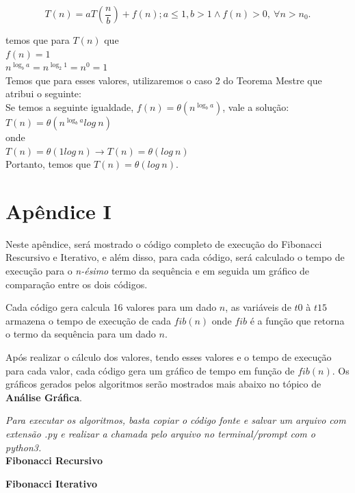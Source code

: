 \documentclass[a4paper, 12pt]{article}
\begin{document}
\begin{equation}
T(n)= aT(\frac{n}{b})+f(n); a\leq1, b>1 \wedge f(n) > 0, \ \forall n>n_0.
\end{equation}

temos que para $T(n)$ que\\

$f(n)=1$\\
$n^{\log_b a} = n^{\log_2 1} = n^0 = 1$\\

Temos que para esses valores, utilizaremos o caso 2 do Teorema Mestre que atribui o seguinte:\\

Se temos a seguinte igualdade, $f(n) = \theta(n^{\log_b a})$, vale a solução:\\

$T(n) = \theta(n^{\log_b a}log \ n)$ \\

onde \\

$T(n) = \theta(1log \ n) \rightarrow T(n) = \theta(log \ n)$ \\

Portanto, temos que $T(n) = \theta(log \ n)$.

\newpage
\section{Apêndice I}
Neste apêndice, será mostrado o código completo de execução do Fibonacci Rescursivo e Iterativo, e além disso, para cada código, será calculado o tempo de execução para o {\it n-ésimo} termo da sequência e em seguida um gráfico de comparação entre os dois códigos.

Cada código gera calcula 16 valores para um dado $n$, as variáveis de $t0$ à $t15$ armazena o tempo de execução de cada $fib(n)$ onde $fib$ é a função que retorna o termo da sequência para um dado $n$.

Após realizar o cálculo dos valores, tendo esses valores e o tempo de execução para cada valor, cada código gera um gráfico de tempo em função de $fib(n)$. Os gráficos gerados pelos algoritmos serão mostrados mais abaixo no tópico de {\bf Análise Gráfica}.

{\it Para executar os algoritmos, basta copiar o código fonte e salvar um arquivo com extensão .py e realizar a chamada pelo arquivo no terminal/prompt com o python3.}\\

{\large\bf Fibonacci Recursivo}

\vspace{0.3cm}
{\large\bf\quad Fibonacci Iterativo}

\end{document}
